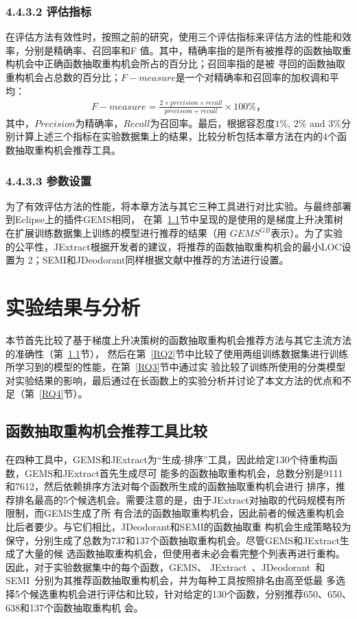 \subsubsection{4.4.3.2 评估指标}
在评估方法有效性时，按照之前的研究，使用三个评估指标来评估方法的性能和效率，分别是精确率、召回率和F
值。其中，精确率指的是所有被推荐的函数抽取重构机会中正确函数抽取重构机会所占的百分比；召回率指的是被
寻回的函数抽取重构机会占总数的百分比；$F-measure$是一个对精确率和召回率的加权调和平均：
\begin{eqnarray}
  F-measure = \frac{2 \times precision \times recall}{precision + recall} \times 100\%，
\end{eqnarray}
其中，$Precision$为精确率，$Recall$为召回率。最后，根据容忍度$1\%$, $2\%$ and $3\%$分别计算上述三个指标在实验数据集上的结果，比较分析包括本章方法在内的4个函数抽取重构机会推荐工具。

\subsubsection{4.4.3.3 参数设置}
为了有效评估方法的性能，将本章方法与其它三种工具进行对比实验。与最终部署到Eclipse上的插件GEMS相同，
在第~\ref{RQ1}节中呈现的是使用的是梯度上升决策树在扩展训练数据集上训练的模型进行推荐的结果（用
$GEMS^{GB}$表示）。为了实验的公平性，JExtract根据开发者的建议，将推荐的函数抽取重构机会的最小LOC设置为
2；SEMI和JDeodorant同样根据文献中推荐的方法进行设置。

\section{实验结果与分析}
本节首先比较了基于梯度上升决策树的函数抽取重构机会推荐方法与其它主流方法的准确性（第~\ref{RQ1}节），
然后在第~\ref{RQ2}节中比较了使用两组训练数据集进行训练所学习到的模型的性能，在第~\ref{RQ3}节中通过实
验比较了训练所使用的分类模型对实验结果的影响，最后通过在长函数上的实验分析并讨论了本文方法的优点和不
足（第~\ref{RQ4}节）。

\subsection{函数抽取重构机会推荐工具比较}\label{RQ1}
在四种工具中，GEMS和JExtract为``生成-排序''工具，因此给定130个待重构函数，GEMS和JExtract首先生成尽可
能多的函数抽取重构机会，总数分别是9111和7612，然后依赖排序方法对每个函数所生成的函数抽取重构机会进行
排序，推荐排名最高的5个候选机会。需要注意的是，由于JExtract对抽取的代码规模有所限制，而GEMS生成了所
有合法的函数抽取重构机会，因此前者的候选重构机会比后者要少。与它们相比，JDeodorant和SEMI的函数抽取重
构机会生成策略较为保守，分别生成了总数为737和137个函数抽取重构机会。尽管GEMS和JExtract生成了大量的候
选函数抽取重构机会，但使用者未必会看完整个列表再进行重构。因此，对于实验数据集中的每个函数，GEMS、
JExtract~\cite{silva:ICPC14}、JDeodorant~\cite{tsantalis2011identification}和
SEMI~\cite{charalampidou2016identifying}分别为其推荐函数抽取重构机会，并为每种工具按照排名由高至低最
多选择5个候选重构机会进行评估和比较，针对给定的130个函数，分别推荐650、650、638和137个函数抽取重构机
会。

